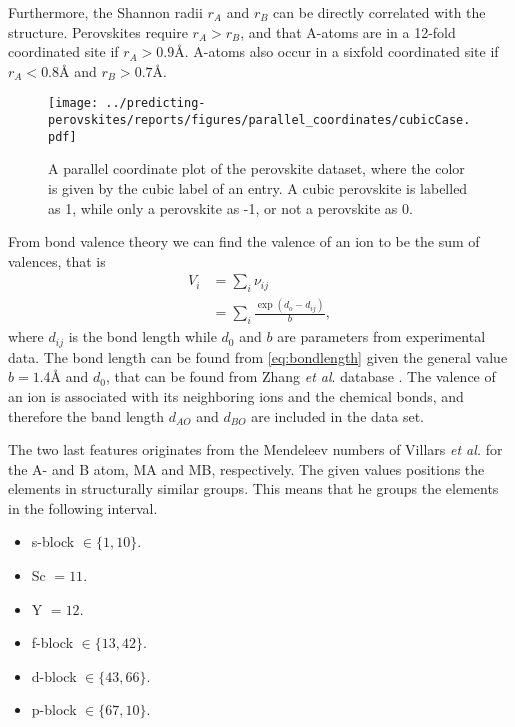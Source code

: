 Furthermore, the Shannon radii $r_A$ and $r_B$ can be directly correlated with the structure. Perovskites require $r_A > r_B$, and that A-atoms are in a 12-fold coordinated site if $r_A > 0.9\text{\AA}$. A-atoms also occur in a sixfold coordinated site if $r_A < 0.8\text{\AA}$ and $r_B >0.7\text{\AA}$.

\begin{figure}[ht!]
  \centering
  \texttt{[image: ../predicting-perovskites/reports/figures/parallel\_coordinates/cubicCase.pdf]}
  \vspace*{-130mm}
  \caption{A parallel coordinate plot of the perovskite dataset, where the color is given by the cubic label of an entry. A cubic perovskite is labelled as 1, while only a perovskite as -1, or not a perovskite as 0.}
  \label{fig:plcp}
\end{figure}

From bond valence theory we can find the valence of an ion to be the sum of valences, that is
\begin{align}
  V_i &= \sum_i \nu_{ij} \\
  &= \sum_i \frac{\exp(d_o - d_{ij})}{b} \label{eq:bondlength},
\end{align}
where $d_{ij}$ is the bond length while $d_0$ and $b$ are parameters from experimental data. The bond length can be found from \ref{eq:bondlength} given the general value $b=1.4\text{\AA}$ and $d_0$, that can be found from Zhang \textit{et al}. database \cite{Zhang2007}. The valence of an ion is associated with its neighboring ions and the chemical bonds, and therefore the band length $d_{AO}$ and $d_{BO}$ are included in the data set.

The two last features originates from the Mendeleev numbers of Villars \textit{et al.} \cite{Villars2004} for the A- and B atom, MA and MB, respectively. The given values positions the elements in structurally similar groups. This means that he groups the elements in the following interval.

\begin{itemize}
  \item s-block $\in \{1,10\}$.
  \item Sc $ = 11$.
  \item Y  $ = 12$.
  \item f-block $\in \{13,42\}$.
  \item d-block $\in \{43,66\}$.
  \item p-block $\in \{67,10\}$.
\end{itemize}

